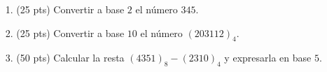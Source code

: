 \documentclass[a4paper,12pt,twoside,spanish]{amsbook}
\begin{document}

\begin{ejercicio}
	\begin{enumerate}
		\item[1.] (25 pts) Convertir a base $2$ el número $345$. 
		\item[2.] (25 pts) Convertir a base $10$ el número $(203112)_4$. 
		\item[3.] (50 pts) Calcular  la resta $(4351)_8 -(2310)_4$ y expresarla en base $5$. 
	\end{enumerate}
\end{ejercicio}

\begin{comment}
\begin{solucion}
	\noindent\text{{1.}} Primero calculamos en base 10 el número  $(20332)_5$:
	\begin{align*}
	(20332)_5 &= 2 \cdot 5^4+0 \cdot 5^3+3\cdot 5^2+ 3 \cdot 5^1+ 2 \cdot 5^0\\
	&=  2 \cdot 625+0 \cdot 125+3\cdot 25+ 3 \cdot 5+ 2\\
	& = 1250 + 0 + 75  + 15 +2  \\
	&= 1342.
	\end{align*}
	Ahora lo convertimos a  base 8:
	\begin{equation*}
	\begin{matrix*}[r]
	1342 &=& 8 \cdot 167& + &6\\
	167 &=&  8 \cdot 20& + &7\\
	20 &=&  8 \cdot 2& + &4\\
	2 &=&  8 \cdot 0& + &2
	\end{matrix*}
	\end{equation*}
	Luego, la respuesta es $(20332)_5 = (2476)_8$.
	
	\vskip .4cm	
	\noindent{2.} Calculamos primero en base 10 los números $(4321)_5$ y $(302)_5$.
	\vskip .2cm
	$(4321)_5 = 4 \cdot 5^3+3\cdot 5^2+ 2\cdot 5^1+ 1 \cdot 5^0 =  4 \cdot 125+3\cdot 25+ 2\cdot 5+ 1 = 586$.
	\vskip .2cm
	$(302)_5 =3\cdot 5^2+ 0\cdot 5^1+ 2 \cdot 5^0 =  3\cdot 25+ 0\cdot 5+ 2 = 77$.
	\vskip .2cm
	Ahora restamos $586 -77= 509$. Al resultado  obtenido lo convertimos a base 5:
	\begin{equation*}
	\begin{matrix*}[r]
	509 &=& 5 \cdot 101& + &4\\
	101 &=& 5 \cdot 20& + &1\\
	20 &=&  5 \cdot 4& + &0\\
	4 &=&  5 \cdot 0& + &4.
	\end{matrix*}
	\end{equation*}
	Luego $509 = (4014)_5$ y por lo tanto,
	\begin{equation*}
	(4321)_5 - (302)_5 = (4014)_5.
	\end{equation*}
\end{solucion}
\end{comment}
\end{document}
